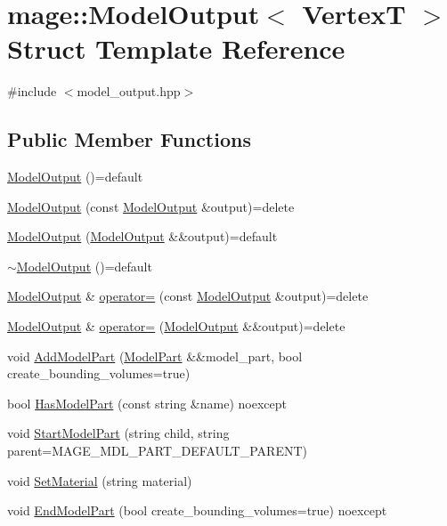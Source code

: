 \hypertarget{structmage_1_1_model_output}{}\section{mage\+:\+:Model\+Output$<$ VertexT $>$ Struct Template Reference}
\label{structmage_1_1_model_output}


{\ttfamily \#include $<$model\+\_\+output.\+hpp$>$}

\subsection*{Public Member Functions}
\begin{DoxyCompactItemize}
\item 
\hyperlink{structmage_1_1_model_output_a7d64b57d8207968541eb9c6da6ef0163}{Model\+Output} ()=default
\item 
\hyperlink{structmage_1_1_model_output_aa5f5b2ae1c2ab2827101567bb9aea0c6}{Model\+Output} (const \hyperlink{structmage_1_1_model_output}{Model\+Output} \&output)=delete
\item 
\hyperlink{structmage_1_1_model_output_a1ed01fcfc7e13e9a304bfb771afd6f9a}{Model\+Output} (\hyperlink{structmage_1_1_model_output}{Model\+Output} \&\&output)=default
\item 
\hyperlink{structmage_1_1_model_output_a69a7f27486ad287943cbf973107ad8e1}{$\sim$\+Model\+Output} ()=default
\item 
\hyperlink{structmage_1_1_model_output}{Model\+Output} \& \hyperlink{structmage_1_1_model_output_a8b7a5462238fb3b32f584199c19018d5}{operator=} (const \hyperlink{structmage_1_1_model_output}{Model\+Output} \&output)=delete
\item 
\hyperlink{structmage_1_1_model_output}{Model\+Output} \& \hyperlink{structmage_1_1_model_output_af8389323467cebe3bacbb66319a41403}{operator=} (\hyperlink{structmage_1_1_model_output}{Model\+Output} \&\&output)=delete
\item 
void \hyperlink{structmage_1_1_model_output_ad62942de2a55fce53d31aeafa1d0795a}{Add\+Model\+Part} (\hyperlink{structmage_1_1_model_part}{Model\+Part} \&\&model\+\_\+part, bool create\+\_\+bounding\+\_\+volumes=true)
\item 
bool \hyperlink{structmage_1_1_model_output_a90c6d42d13813b9c340bd1a250276a8d}{Has\+Model\+Part} (const string \&name) noexcept
\item 
void \hyperlink{structmage_1_1_model_output_a833c8e380e2812ab0ca2853bb915e75f}{Start\+Model\+Part} (string child, string parent=M\+A\+G\+E\+\_\+\+M\+D\+L\+\_\+\+P\+A\+R\+T\+\_\+\+D\+E\+F\+A\+U\+L\+T\+\_\+\+P\+A\+R\+E\+NT)
\item 
void \hyperlink{structmage_1_1_model_output_a26836ecfea7e7f78cc1c1e37da915230}{Set\+Material} (string material)
\item 
void \hyperlink{structmage_1_1_model_output_aca4628ef55d8ded956de4c06e1433f45}{End\+Model\+Part} (bool create\+\_\+bounding\+\_\+volumes=true) noexcept
\end{DoxyCompactItemize}
